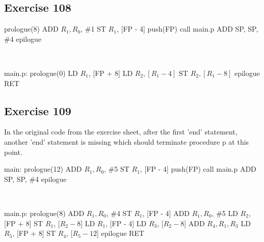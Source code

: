 \documentclass[12pt,fleqn]{article}		%
\begin{document}
\subsection{Exercise 108}
\begin{algorithmic}
\State prologue(8)
\State ADD $R_1, R_0$, \#1
\State ST $R_1$, [FP - 4]
\State {}
\State push(FP)
\State call main.p
\State ADD SP, SP, \#4
\State epilogue
\end{algorithmic}
\ \\
\begin{algorithmic}
\State main.p:
\State prologue(0)
\State {}
\State LD $R_1$, [FP + 8]
\State LD $R_2, [R_1 - 4]$
\State ST $R_2, [R_1 - 8]$
\State epilogue
\State RET
\end{algorithmic}

\subsection{Exercise 109}
In the original code from the exercise sheet, after the first 'end' statement, another 'end' statement is missing which should terminate procedure p at this point.
\begin{algorithmic}
\State main:
\State prologue(12)
\State ADD $R_1, R_0$, \#5
\State ST $R_1$, [FP - 4]
\State {}
\State push(FP)
\State call main.p
\State ADD SP, SP, \#4
\State epilogue
\end{algorithmic}
\ \\
\begin{algorithmic}
\State main.p:
\State prologue(8)
\State {}
\State ADD $R_1, R_0$, \#4
\State ST $R_1$, [FP - 4]
\State {}
\State ADD $R_1, R_0$, \#5
\State {}
\State LD $R_2$, [FP + 8]
\State ST $R_1$, [$R_2 - 8$]
\State {}
\State LD $R_1$, [FP - 4]
\State LD $R_3$, [$R_2 - 8$] 
\State ADD $R_4, R_1, R_3$
\State LD $R_5$, [FP + 8]
\State ST $R_4$, [$R_5 - 12$]
\State epilogue
\State RET
\end{algorithmic}
\end{document}
